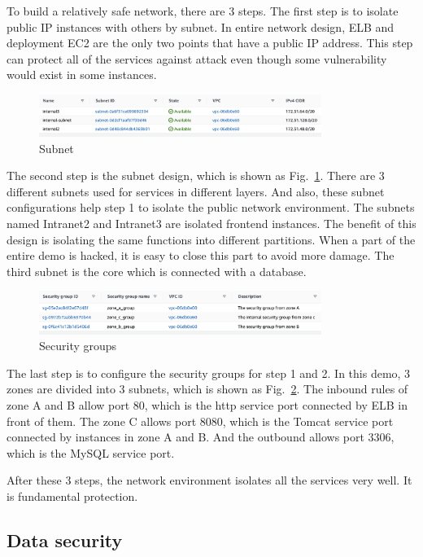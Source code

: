 \documentclass[conference]{IEEEtran}
\begin{document}
To build a relatively safe network, there are 3 steps. The first step is to isolate public IP instances with others by subnet. In entire network design, 
ELB and deployment EC2 are the only two points that have a public IP address. This step can protect all of the services against attack even though some vulnerability 
would exist in some instances.

\begin{figure}[htbp]
    \centerline{\includegraphics[width=260pt]{images/subnet.png}}
    \caption{Subnet}
    \label{subnet}
\end{figure}

The second step is the subnet design, which is shown as Fig.~\ref{subnet}. There are 3 different subnets used for services in different layers. And also, 
these subnet configurations help step 1 to isolate the public network environment. The subnets named Intranet2 and Intranet3 are isolated frontend 
instances. The benefit of this design is isolating the same functions into different partitions. When a part of the entire demo is hacked, it is easy 
to close this part to avoid more damage. The third subnet is the core which is connected with a database.

\begin{figure}[htbp]
    \centerline{\includegraphics[width=260pt]{images/security.png}}
    \caption{Security groups}
    \label{Security}
\end{figure}

The last step is to configure the security groups for step 1 and 2. In this demo, 3 zones are divided into 3 subnets, which is shown as Fig.~\ref{Security}. The inbound 
rules of zone A and B allow port 80, which is the http service port connected by ELB in front of them. The zone C allows port 8080, which is the Tomcat 
service port connected by instances in zone A and B. And the outbound allows port 3306, which is the MySQL service port.

After these 3 steps, the network environment isolates all the services very well. It is fundamental protection.


\subsection{Data security}
\end{document}
